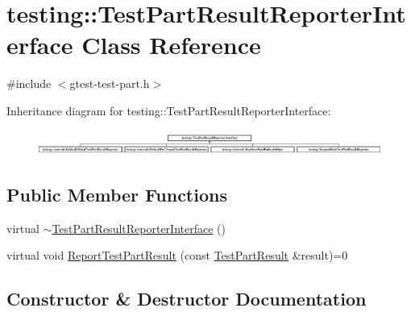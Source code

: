 \hypertarget{classtesting_1_1_test_part_result_reporter_interface}{}\section{testing\+:\+:Test\+Part\+Result\+Reporter\+Interface Class Reference}
\label{classtesting_1_1_test_part_result_reporter_interface}


{\ttfamily \#include $<$gtest-\/test-\/part.\+h$>$}

Inheritance diagram for testing\+:\+:Test\+Part\+Result\+Reporter\+Interface\+:\begin{figure}[H]
\begin{center}
\leavevmode
\includegraphics[height=0.825959cm]{classtesting_1_1_test_part_result_reporter_interface}
\end{center}
\end{figure}
\subsection*{Public Member Functions}
\begin{DoxyCompactItemize}
\item 
virtual \hyperlink{classtesting_1_1_test_part_result_reporter_interface_a338b51591ed654f84dc0feaaf2b66917}{$\sim$\+Test\+Part\+Result\+Reporter\+Interface} ()
\item 
virtual void \hyperlink{classtesting_1_1_test_part_result_reporter_interface_aa2f920e7a5a0a6d0faf19e3727928c22}{Report\+Test\+Part\+Result} (const \hyperlink{classtesting_1_1_test_part_result}{Test\+Part\+Result} \&result)=0
\end{DoxyCompactItemize}


\subsection{Constructor \& Destructor Documentation}
\hypertarget{classtesting_1_1_test_part_result_reporter_interface_a338b51591ed654f84dc0feaaf2b66917}{}
